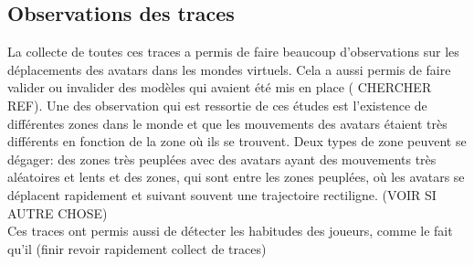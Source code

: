 	\subsection{Observations des traces}
	 La collecte de toutes ces traces a permis de faire beaucoup d'observations sur les déplacements des avatars dans les mondes virtuels. Cela a aussi permis de faire valider ou invalider des modèles qui avaient été mis en place ( CHERCHER REF). Une des observation qui est ressortie de ces études est l'existence de différentes zones dans le monde et que les mouvements des avatars étaient très différents en fonction de la zone où ils se trouvent. Deux types de zone peuvent se dégager: des zones très peuplées avec des avatars ayant des mouvements très aléatoires et lents et des zones, qui sont entre les zones peuplées, où les avatars se déplacent rapidement et suivant souvent une trajectoire rectiligne. (VOIR SI AUTRE CHOSE) \\
	
	Ces traces ont permis aussi de détecter les habitudes des joueurs, comme le fait qu'il (finir revoir rapidement collect de traces)
	
